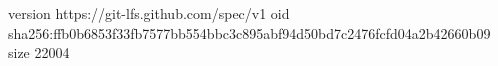 version https://git-lfs.github.com/spec/v1
oid sha256:ffb0b6853f33fb7577bb554bbc3c895abf94d50bd7c2476fcfd04a2b42660b09
size 22004

